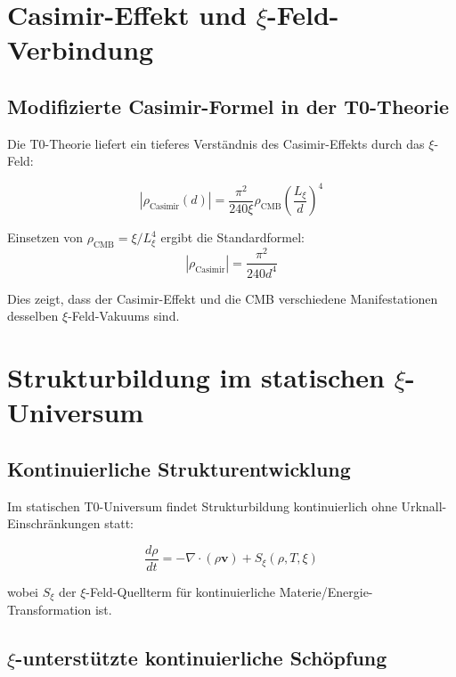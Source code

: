 	\section{Casimir-Effekt und $\xi$-Feld-Verbindung}
	
	\subsection{Modifizierte Casimir-Formel in der T0-Theorie}
	
	Die T0-Theorie liefert ein tieferes Verständnis des Casimir-Effekts durch das $\xi$-Feld:
	
	\begin{equation}
		|\rho_{\text{Casimir}}(d)| = \frac{\pi^2}{240 \xi} \rho_{\text{CMB}} \left(\frac{L_\xi}{d}\right)^4
	\end{equation}
	
	Einsetzen von $\rho_{\text{CMB}} = \xi/L_\xi^4$ ergibt die Standardformel:
	\begin{equation}
		|\rho_{\text{Casimir}}| = \frac{\pi^2}{240 d^4}
	\end{equation}
	
	Dies zeigt, dass der Casimir-Effekt und die CMB verschiedene Manifestationen desselben $\xi$-Feld-Vakuums sind.
	
	\section{Strukturbildung im statischen $\xi$-Universum}
	
	\subsection{Kontinuierliche Strukturentwicklung}
	
	Im statischen T0-Universum findet Strukturbildung kontinuierlich ohne Urknall-Einschränkungen statt:
	
	\begin{equation}
		\frac{d\rho}{dt} = -\nabla \cdot (\rho \mathbf{v}) + S_\xi(\rho, T, \xi)
	\end{equation}
	
	wobei $S_\xi$ der $\xi$-Feld-Quellterm für kontinuierliche Materie/Energie-Transformation ist.
	
	\subsection{$\xi$-unterstützte kontinuierliche Schöpfung}
	
